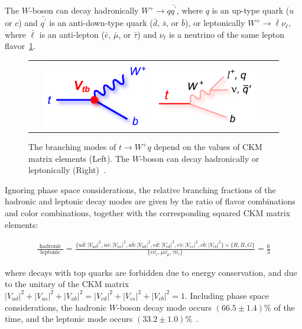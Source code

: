 \begin{refsection}
The $W$-boson can decay hadronically $W^+ \rightarrow q \bar{q^\prime}$, where $q$ is an up-type quark ($u$ or $c$) and $\bar{q^\prime}$ is an anti-down-type quark ($\bar{d}$, $\bar{s}$, or $\bar{b}$), or leptonically $W^+ \rightarrow \bar{\ell} \nu_\ell$, where $\bar{\ell}$ is an anti-lepton ($\bar{e}$, $\bar{\mu}$, or $\bar{\tau}$) and $\nu_\ell$ is a neutrino of the same lepton flavor~\ref{t_decay}.
\begin{figure}[htb]
  \begin{center}
    \begin{tabular}{cc}
        \includegraphics[width=0.45\textwidth]{fig_TopQuark/feynman_t_decay_Vtb_blue.png}
        \includegraphics[width=0.45\textwidth]{fig_TopQuark/feynman_t_decay_ljetsqq_pink.png}
    \end{tabular}
    \caption{The branching modes of $t \rightarrow W^+ q$ depend on the values of CKM matrix elements (Left).
             The $W$-boson can decay hadronically or leptonically (Right)~\cite{d0_diagrams}.
    }
    \label{t_decay}
  \end{center}
\end{figure}
Ignoring phase space considerations, the relative branching fractions of the hadronic and leptonic decay modes are given by the ratio of flavor combinations and color combinations, together with the corresponding squared CKM matrix elements:
\begin{linenomath*}
{\small
\begin{align}
\frac{\text { hadronic }}{\text { leptonic }}=\frac{ \{ u\bar{d}:{\vert V_{ud} \vert}^2, u\bar{s}:{\vert V_{us} \vert}^2, u\bar{b}:{\vert V_{ub} \vert}^2, c\bar{d}:{\vert V_{cd} \vert}^2, c\bar{s}:{\vert V_{cs} \vert}^2, c\bar{b}:{\vert V_{cb} \vert}^2 \} \times \{ R, B, G\} }{ \{ e \bar{\nu_e }, \mu \bar{\nu_\mu}, \tau \bar{\nu_\tau} \}} = \frac{6}{3}
\end{align}
}%
\end{linenomath*}
where decays with top quarks are forbidden due to energy conservation, and due to the unitary of the CKM matrix ${\vert V_{ud} \vert}^2 + {\vert V_{us} \vert}^2 + {\vert V_{ub} \vert}^2 = {\vert V_{cd} \vert}^2 + {\vert V_{cs} \vert}^2 + {\vert V_{cb} \vert}^2 = 1$.
Including phase space considerations, the hadronic $W$-boson decay mode occurs $(66.5 \pm  1.4) \%$ of the time, and the leptonic mode occurs $(33.2 \pm 1.0) \%$~\cite{bib:PDG}.


\end{refsection}
